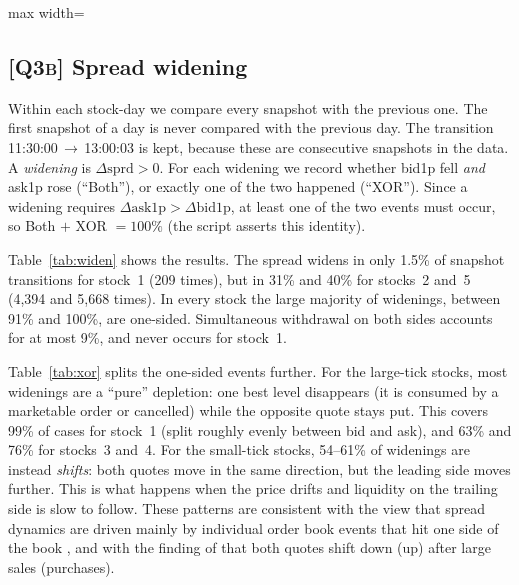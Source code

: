 \documentclass[11pt,a4paper]{article}
\newcommand{\Q}[1]{\textsc{[Q#1]}}
\begin{document}
\begin{table}[H]
\centering\small
\caption{\Q{3a} Spread in ticks and in basis points of the mid-quote.}
\label{tab:spreadrel}
\begin{adjustbox}{max width=\textwidth}

\end{adjustbox}
\end{table}

\subsection*{\Q{3b} Spread widening}

Within each stock-day we compare every snapshot with the previous one. The first snapshot of a day
is never compared with the previous day. The transition 11:30:00\,$\to$\,13:00:03 is kept, because
these are consecutive snapshots in the data. A \emph{widening} is $\Delta\text{sprd}>0$. For each
widening we record whether bid1p fell \emph{and} ask1p rose (``Both''), or exactly one of the two
happened (``XOR''). Since a widening requires $\Delta\text{ask1p} > \Delta\text{bid1p}$, at least
one of the two events must occur, so Both $+$ XOR $=100\%$ (the script asserts this identity).

\begin{table}[H]
\centering\small
\caption{\Q{3b} Spread-widening events and how the two best quotes moved.}
\label{tab:widen}

\end{table}

Table~\ref{tab:widen} shows the results. The spread widens in only 1.5\% of snapshot transitions for
stock~1 (209 times), but in 31\% and 40\% for stocks~2 and~5 (4{,}394 and 5{,}668 times). In every
stock the large majority of widenings, between 91\% and 100\%, are one-sided. Simultaneous
withdrawal on both sides accounts for at most 9\%, and never occurs for stock~1.

Table~\ref{tab:xor} splits the one-sided events further. For the large-tick stocks, most widenings
are a ``pure'' depletion: one best level disappears (it is consumed by a marketable order or
cancelled) while the opposite quote stays put. This covers 99\% of cases for stock~1 (split roughly
evenly between bid and ask), and 63\% and 76\% for stocks~3 and~4. For the small-tick stocks, 54--61\% of widenings are instead
\emph{shifts}: both quotes move in the same direction, but the leading side moves further. This is
what happens when the price drifts and liquidity on the trailing side is slow to follow. These
patterns are consistent with the view that spread dynamics are driven mainly by individual order
book events that hit one side of the book \citep{eisler2012}, and with the finding of
\citet{biais1995} that both quotes shift down (up) after large sales (purchases).
\end{document}
